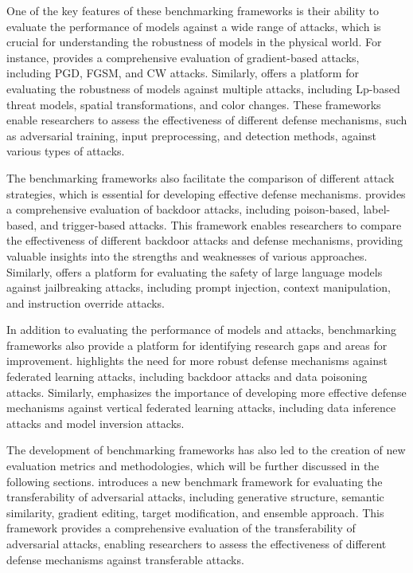 \documentclass[11pt]{article}
\begin{document}
One of the key features of these benchmarking frameworks is their ability to evaluate the performance of models against a wide range of attacks, which is crucial for understanding the robustness of models in the physical world. For instance, \cite{ref171} provides a comprehensive evaluation of gradient-based attacks, including PGD, FGSM, and CW attacks. Similarly, \cite{ref173} offers a platform for evaluating the robustness of models against multiple attacks, including Lp-based threat models, spatial transformations, and color changes. These frameworks enable researchers to assess the effectiveness of different defense mechanisms, such as adversarial training, input preprocessing, and detection methods, against various types of attacks.

The benchmarking frameworks also facilitate the comparison of different attack strategies, which is essential for developing effective defense mechanisms. \cite{ref172} provides a comprehensive evaluation of backdoor attacks, including poison-based, label-based, and trigger-based attacks. This framework enables researchers to compare the effectiveness of different backdoor attacks and defense mechanisms, providing valuable insights into the strengths and weaknesses of various approaches. Similarly, \cite{ref174} offers a platform for evaluating the safety of large language models against jailbreaking attacks, including prompt injection, context manipulation, and instruction override attacks.

In addition to evaluating the performance of models and attacks, benchmarking frameworks also provide a platform for identifying research gaps and areas for improvement. \cite{ref175} highlights the need for more robust defense mechanisms against federated learning attacks, including backdoor attacks and data poisoning attacks. Similarly, \cite{ref176} emphasizes the importance of developing more effective defense mechanisms against vertical federated learning attacks, including data inference attacks and model inversion attacks.

The development of benchmarking frameworks has also led to the creation of new evaluation metrics and methodologies, which will be further discussed in the following sections. \cite{ref177} introduces a new benchmark framework for evaluating the transferability of adversarial attacks, including generative structure, semantic similarity, gradient editing, target modification, and ensemble approach. This framework provides a comprehensive evaluation of the transferability of adversarial attacks, enabling researchers to assess the effectiveness of different defense mechanisms against transferable attacks.
\end{document}
